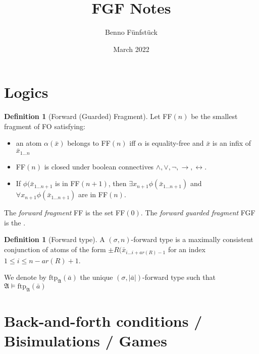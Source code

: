 \documentclass{scrartcl}
\title{FGF Notes}
\author{Benno Fünfstück}
\date{March 2022}
\theoremstyle{definition}
\newtheorem{definition}[theorem]{Definition}
\begin{document}
\maketitle

\section{Logics}

\begin{definition}[Forward (Guarded) Fragment]
Let FF$(n)$ be the smallest fragment of FO satisfying:

\begin{itemize}
    \item an atom $\alpha(\bar{x})$ belongs to FF$(n)$ iff $\alpha$ is equality-free and $\bar{x}$ is an infix of $\bar{x}_{1\ldots{}n}$
    \item FF$(n)$ is closed under boolean connectives $\land, \lor, \neg, \rightarrow, \leftrightarrow$.
    \item If $\phi(\bar{x}_{1\ldots{}n+1}$ is in FF$(n+1)$, then $\exists{x_{n+1}}\phi(\bar{x}_{1\ldots{}n+1})$ and $\forall{x_{n+1}}\phi(\bar{x}_{1\ldots{}n+1})$ are in FF$(n)$.
\end{itemize}

The \emph{forward fragment} FF is the set FF$(0)$.
The \emph{forward guarded fragment} FGF is the .
\end{definition}

\begin{definition}[Forward type]
A $(\sigma,n)$-forward type is a maximally consistent conjunction of atoms of the form $\pm{}R(\bar{x}_{i\ldots{}i+ar(R)-1}$ for an index $1 \leq i \leq n - ar(R) + 1$.
\end{definition}

We denote by $\mathrm{ftp}_\mathfrak{A}(\bar{a})$ the unique $(\sigma,|\bar{a}|)$-forward type such that $\mathfrak{A} \models \mathrm{ftp}_\mathfrak{A}(\bar{a})$

\section{Back-and-forth conditions / Bisimulations / Games}
\end{document}
